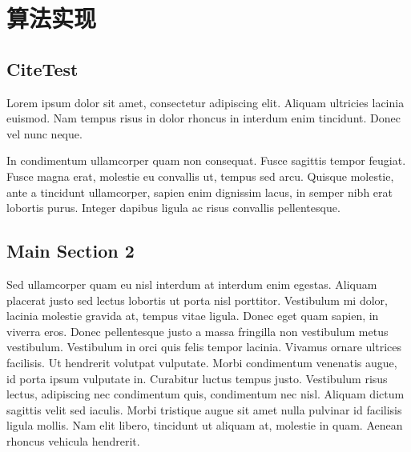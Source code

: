 
\chapter{算法实现} %

\label{Chapter2} 


\section{CiteTest}

Lorem ipsum dolor sit amet, consectetur adipiscing elit. 
Aliquam ultricies lacinia euismod. 
Nam tempus risus in dolor rhoncus in interdum enim tincidunt. 
Donec vel nunc neque.

\cite{Reference3}

In condimentum ullamcorper quam non consequat. 
Fusce sagittis tempor feugiat. 
Fusce magna erat, molestie eu convallis ut, tempus sed arcu. 
Quisque molestie, ante a tincidunt ullamcorper, sapien enim dignissim lacus, in semper nibh erat lobortis purus. 
Integer dapibus ligula ac risus convallis pellentesque.

\section{Main Section 2}

Sed ullamcorper quam eu nisl interdum at interdum enim egestas. 
Aliquam placerat justo sed lectus lobortis ut porta nisl porttitor. 
Vestibulum mi dolor, lacinia molestie gravida at, tempus vitae ligula. 
Donec eget quam sapien, in viverra eros. 
Donec pellentesque justo a massa fringilla non vestibulum metus vestibulum. 
Vestibulum in orci quis felis tempor lacinia. 
Vivamus ornare ultrices facilisis. 
Ut hendrerit volutpat vulputate. 
Morbi condimentum venenatis augue, id porta ipsum vulputate in. 
Curabitur luctus tempus justo. 
Vestibulum risus lectus, adipiscing nec condimentum quis, condimentum nec nisl. 
Aliquam dictum sagittis velit sed iaculis. 
Morbi tristique augue sit amet nulla pulvinar id facilisis ligula mollis. 
Nam elit libero, tincidunt ut aliquam at, molestie in quam. 
Aenean rhoncus vehicula hendrerit.